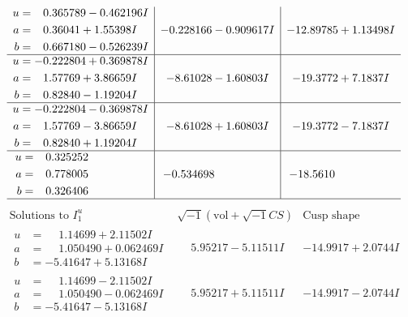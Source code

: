\documentclass[1p]{elsarticle_modified}
\theoremstyle{definition}
\newcommand{\I}{\sqrt{-1}}
\begin{document}
$$\begin{array}{c|c|c}
\begin{aligned}
u &= \phantom{-}0.365789 - 0.462196 I \\
a &= \phantom{-}0.36041 + 1.55398 I \\
b &= \phantom{-}0.667180 - 0.526239 I\end{aligned}
 & -0.228166 - 0.909617 I & -12.89785 + 1.13498 I \\ \hline\begin{aligned}
u &= -0.222804 + 0.369878 I \\
a &= \phantom{-}1.57769 + 3.86659 I \\
b &= \phantom{-}0.82840 - 1.19204 I\end{aligned}
 & -8.61028 - 1.60803 I & -19.3772 + 7.1837 I \\ \hline\begin{aligned}
u &= -0.222804 - 0.369878 I \\
a &= \phantom{-}1.57769 - 3.86659 I \\
b &= \phantom{-}0.82840 + 1.19204 I\end{aligned}
 & -8.61028 + 1.60803 I & -19.3772 - 7.1837 I \\ \hline\begin{aligned}
u &= \phantom{-}0.325252\phantom{ +0.000000I} \\
a &= \phantom{-}0.778005\phantom{ +0.000000I} \\
b &= \phantom{-}0.326406\phantom{ +0.000000I}\end{aligned}
 & -0.534698\phantom{ +0.000000I} & -18.5610\phantom{ +0.000000I}\\
 \hline 
 \end{array}$$\newpage$$\begin{array}{c|c|c}  
\text{Solutions to }I^u_{1}& \I (\text{vol} + \sqrt{-1}CS) & \text{Cusp shape}\\
 \hline 
\begin{aligned}
u &= \phantom{-}1.14699 + 2.11502 I \\
a &= \phantom{-}1.050490 + 0.062469 I \\
b &= -5.41647 + 5.13168 I\end{aligned}
 & \phantom{-}5.95217 - 5.11511 I & -14.9917 + 2.0744 I \\ \hline\begin{aligned}
u &= \phantom{-}1.14699 - 2.11502 I \\
a &= \phantom{-}1.050490 - 0.062469 I \\
b &= -5.41647 - 5.13168 I\end{aligned}
 & \phantom{-}5.95217 + 5.11511 I & -14.9917 - 2.0744 I \\ \hline\begin{aligned}

\end{aligned}
\end{array}$$
\end{document}

